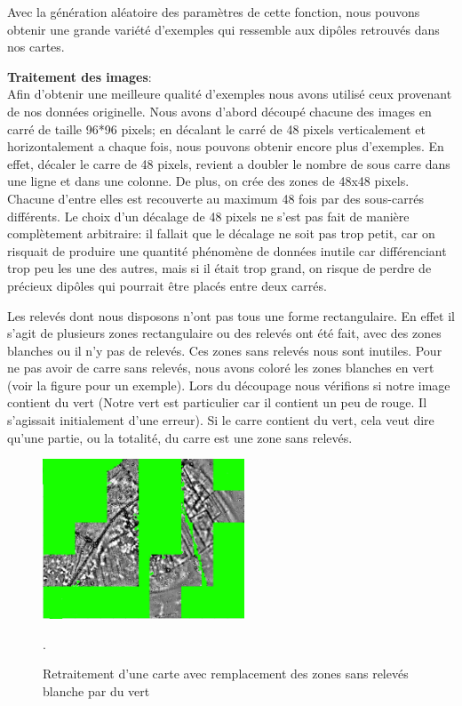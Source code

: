 \documentclass[a4paper, 12pt, titlepage, oneside, french]{article}
\begin{document}
	Avec la génération aléatoire des paramètres de cette fonction, nous pouvons obtenir une grande variété d'exemples qui ressemble aux dipôles retrouvés dans nos cartes.

	\textbf{Traitement des images}:\\%
	\indent Afin d'obtenir une meilleure qualité d'exemples nous avons utilisé ceux provenant de nos données originelle. Nous avons d'abord découpé chacune des images en carré de taille 96*96 pixels; en décalant le carré de 48 pixels verticalement et horizontalement a chaque fois, nous pouvons obtenir encore plus d'exemples. En effet, décaler le carre de 48 pixels, revient a doubler le nombre de sous carre dans une ligne et dans une colonne. De plus, on crée des zones de 48x48 pixels. Chacune d'entre elles est recouverte au maximum 48 fois par des sous-carrés différents. 
	Le choix d'un décalage de 48 pixels ne s'est pas fait de manière complètement arbitraire: il fallait que le décalage ne soit pas trop petit, car on risquait de produire une quantité phénomène de données inutile car différenciant trop peu les une des autres, mais si il était trop grand, on risque de perdre de précieux dipôles qui pourrait être placés entre deux carrés. 

Les relevés dont nous disposons n'ont pas tous une forme rectangulaire. En effet il s'agit de plusieurs zones rectangulaire ou des relevés ont été fait, avec des zones blanches ou il n'y pas de relevés. Ces zones sans relevés nous sont inutiles. Pour ne pas avoir de carre sans relevés, nous avons coloré les zones blanches en vert (voir la figure \cite{fig:ReleveColore} pour un exemple). Lors du découpage nous vérifions si notre image contient du vert (Notre vert est particulier car il contient un peu de rouge. Il s'agissait initialement d'une erreur). Si le carre contient du vert, cela veut dire qu'une partie, ou la totalité, du carre est une zone sans relevés.

\begin{figure}[H]
	\centering
		\includegraphics[width=6cm]{ExemplePretraitement.jpg}
		\caption{Retraitement d'une carte avec remplacement des zones sans relevés blanche par du vert}. 
		\label{fig:ReleveColore}
\end{figure}
\end{document}
